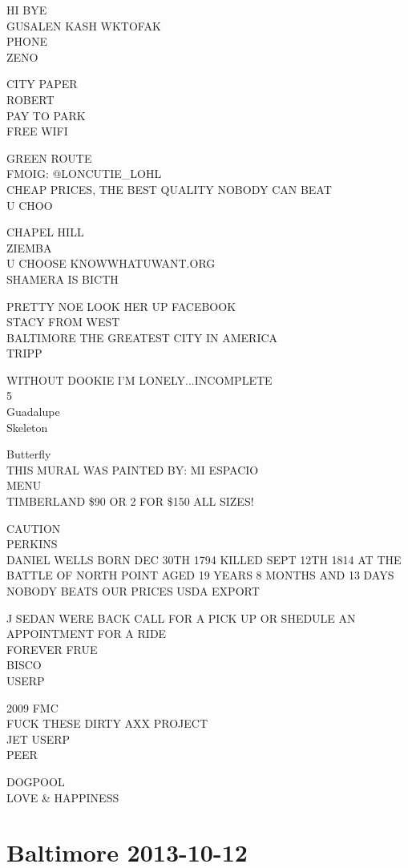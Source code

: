 \documentclass[10pt,letterpaper]{article}
\begin{document}
HI BYE\\
GUSALEN KASH WKTOFAK\\
PHONE\\
ZENO

CITY PAPER\\
ROBERT\\
PAY TO PARK\\
FREE WIFI

GREEN ROUTE\\
FMOIG: @LONCUTIE\_LOHL\\
CHEAP PRICES, THE BEST QUALITY NOBODY CAN BEAT\\
U CHOO

CHAPEL HILL\\
ZIEMBA\\
U CHOOSE KNOWWHATUWANT.ORG\\
SHAMERA IS BICTH

PRETTY NOE LOOK HER UP FACEBOOK\\
STACY FROM WEST\\
BALTIMORE THE GREATEST CITY IN AMERICA\\
TRIPP

WITHOUT DOOKIE I'M LONELY...INCOMPLETE\\
5\\
Guadalupe\\
Skeleton

Butterfly\\
THIS MURAL WAS PAINTED BY: MI ESPACIO\\
MENU\\
TIMBERLAND \$90 OR 2 FOR \$150 ALL SIZES!

CAUTION\\
PERKINS\\
DANIEL WELLS BORN DEC 30TH 1794 KILLED SEPT 12TH 1814 AT THE BATTLE OF NORTH POINT AGED 19 YEARS 8 MONTHS AND 13 DAYS\\
NOBODY BEATS OUR PRICES USDA EXPORT

J SEDAN WERE BACK CALL FOR A PICK UP OR SHEDULE AN APPOINTMENT FOR A RIDE\\
FOREVER FRUE\\
BISCO\\
USERP

2009 FMC\\
FUCK THESE DIRTY AXX PROJECT\\
JET USERP\\
PEER

DOGPOOL\\
LOVE \& HAPPINESS


\section*{Baltimore 2013-10-12}
\end{document}
